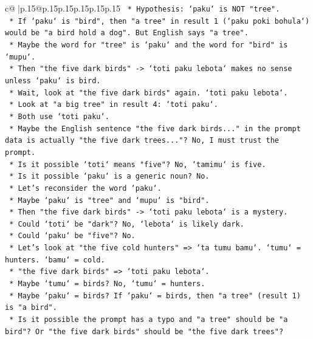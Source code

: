 \documentclass{article}
\begin{document}
{\begin{supertabular}{c@{$\;$}|p{.15\linewidth}@{}p{.15\linewidth}p{.15\linewidth}p{.15\linewidth}p{.15\linewidth}p{.15\linewidth}}
{{{\texttt{            *   Hypothesis: `paku` is NOT "tree".} \\
\texttt{            *   If `paku` is "bird", then "a tree" in result 1 (`paku poki bohula`) would be "a bird hold a dog". But English says "a tree".} \\
\texttt{            *   Maybe the word for "tree" is `paku` and the word for "bird" is `mupu`.} \\
\texttt{            *   Then "the five dark birds" {-}> `toti paku lebota` makes no sense unless `paku` is bird.} \\
\texttt{            *   Wait, look at "the five dark birds" again. `toti paku lebota`.} \\
\texttt{            *   Look at "a big tree" in result 4: `toti paku`.} \\
\texttt{            *   Both use `toti paku`.} \\
\texttt{            *   Maybe the English sentence "the five dark birds..." in the prompt data is actually "the five dark trees..."? No, I must trust the prompt.} \\
\texttt{            *   Is it possible `toti` means "five"? No, `tamimu` is five.} \\
\texttt{            *   Is it possible `paku` is a generic noun? No.} \\
\texttt{            *   Let's reconsider the word `paku`.} \\
\texttt{            *   Maybe `paku` is "tree" and `mupu` is "bird".} \\
\texttt{            *   Then "the five dark birds" {-}> `toti paku lebota` is a mystery.} \\
\texttt{            *   Could `toti` be "dark"? No, `lebota` is likely dark.} \\
\texttt{            *   Could `paku` be "five"? No.} \\
\texttt{            *   Let's look at "the five cold hunters" => `ta tumu bamu`. `tumu` = hunters. `bamu` = cold.} \\
\texttt{            *   "the five dark birds" => `toti paku lebota`.} \\
\texttt{            *   Maybe `tumu` = birds? No, `tumu` = hunters.} \\
\texttt{            *   Maybe `paku` = birds? If `paku` = birds, then "a tree" (result 1) is "a bird".} \\
\texttt{            *   Is it possible the prompt has a typo and "a tree" should be "a bird"? Or "the five dark birds" should be "the five dark trees"?} \\
}}}
\end{supertabular}}
\end{document}

